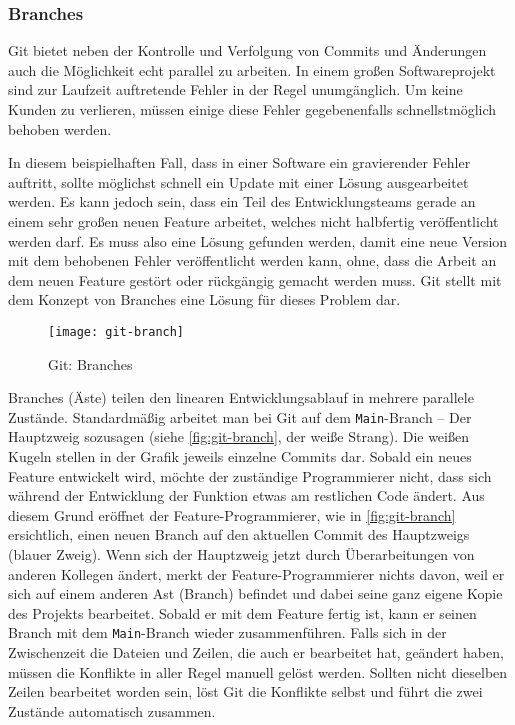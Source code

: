 \subsubsection{Branches}
Git bietet neben der Kontrolle und Verfolgung von Commits und Änderungen auch
die Möglichkeit echt parallel zu arbeiten. In einem großen Softwareprojekt sind
zur Laufzeit auftretende Fehler in der Regel unumgänglich. Um keine Kunden zu
verlieren, müssen einige diese Fehler gegebenenfalls schnellstmöglich behoben
werden.

In diesem beispielhaften Fall, dass in einer Software ein gravierender Fehler
auftritt, sollte möglichst schnell ein Update mit einer Lösung ausgearbeitet
werden. Es kann jedoch sein, dass ein Teil des Entwicklungsteams gerade an einem
sehr großen neuen Feature arbeitet, welches nicht halbfertig veröffentlicht
werden darf. Es muss also eine Lösung gefunden werden, damit eine neue Version
mit dem behobenen Fehler veröffentlicht werden kann, ohne, dass die Arbeit an
dem neuen Feature gestört oder rückgängig gemacht werden muss. Git stellt mit
dem Konzept von Branches eine Lösung für dieses Problem dar.

\begin{figure}[h]
    \centering
    \texttt{[image: git-branch]}
    \caption{Git: Branches}
    \label{fig:git-branch}
\end{figure}

Branches (Äste) teilen den linearen Entwicklungsablauf in mehrere parallele
Zustände. Standardmäßig arbeitet man bei Git auf dem \texttt{Main}-Branch -- Der
Hauptzweig sozusagen (siehe \autoref{fig:git-branch}, der weiße Strang).
Die weißen Kugeln stellen in der Grafik jeweils einzelne Commits dar. Sobald ein
neues Feature entwickelt wird, möchte der zuständige Programmierer nicht, dass
sich während der Entwicklung der Funktion etwas am restlichen Code ändert. Aus
diesem Grund eröffnet der Feature-Programmierer, wie in \autoref{fig:git-branch}
ersichtlich, einen neuen Branch auf den aktuellen Commit des Hauptzweigs (blauer
Zweig). Wenn sich der Hauptzweig jetzt durch Überarbeitungen von anderen
Kollegen ändert, merkt der Feature-Programmierer nichts davon, weil er sich auf
einem anderen Ast (Branch) befindet und dabei seine ganz eigene Kopie des
Projekts bearbeitet. Sobald er mit dem Feature fertig ist, kann er seinen Branch
mit dem \texttt{Main}-Branch wieder zusammenführen. Falls sich in der
Zwischenzeit die Dateien und Zeilen, die auch er bearbeitet hat, geändert haben,
müssen die Konflikte in aller Regel manuell gelöst werden. Sollten nicht
dieselben Zeilen bearbeitet worden sein, löst Git die Konflikte selbst und führt
die zwei Zustände automatisch zusammen.

